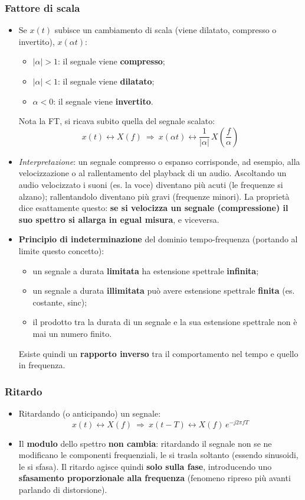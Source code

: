 \documentclass[12pt, a4paper]{article}
\begin{document}
\subsubsection{Fattore di scala}
\begin{itemize}
    \item Se $x(t)$ subisce un cambiamento di scala (viene dilatato, compresso o invertito), $x(\alpha t)$:
    \begin{itemize}
        \item $|\alpha|>1$: il segnale viene \textbf{compresso};
        \item $|\alpha|<1$: il segnale viene \textbf{dilatato};
        \item $\alpha<0$: il segnale viene \textbf{invertito}.
    \end{itemize}
    Nota la FT, si ricava subito quella del segnale scalato:
    $$x(t)\longleftrightarrow X(f)\ \Longrightarrow\ x(\alpha t)\longleftrightarrow\frac{1}{|\alpha|}\,X\!\left(\frac f\alpha\right)$$
    \item \textit{Interpretazione}: un segnale compresso o espanso corrisponde, ad esempio, alla velocizzazione o al rallentamento del playback di un audio. Ascoltando un audio velocizzato i suoni (es. la voce) diventano più acuti (le frequenze si alzano); rallentandolo diventano più gravi (frequenze minori). La proprietà dice esattamente questo: \textbf{se si velocizza un segnale (compressione) il suo spettro si allarga in egual misura}, e viceversa.
    \item \textcolor{orange!80!black}{\textbf{Principio di indeterminazione}} del dominio tempo-frequenza (portando al limite questo concetto):
    \begin{itemize}
        \item un segnale a durata \textbf{limitata} ha estensione spettrale \textbf{infinita};
        \item un segnale a durata \textbf{illimitata} può avere estensione spettrale \textbf{finita} (es. costante, sinc);
        \item il prodotto tra la durata di un segnale e la sua estensione spettrale non è mai un numero finito.
    \end{itemize}
    Esiste quindi un \textbf{rapporto inverso} tra il comportamento nel tempo e quello in frequenza.
\end{itemize}

\subsubsection{Ritardo}
\begin{itemize}
    \item Ritardando (o anticipando) un segnale:
    $$x(t)\longleftrightarrow X(f)\ \Longrightarrow\ x(t-T)\longleftrightarrow X(f)\,e^{-j2\pi fT}$$
    \item Il \textbf{modulo} dello spettro \textbf{non cambia}: ritardando il segnale non se ne modificano le componenti frequenziali, le si trasla soltanto (essendo sinusoidi, le si sfasa). Il ritardo agisce quindi \textbf{solo sulla fase}, introducendo uno \textbf{sfasamento proporzionale alla frequenza} (fenomeno ripreso più avanti parlando di distorsione).
\end{itemize}
\end{document}
